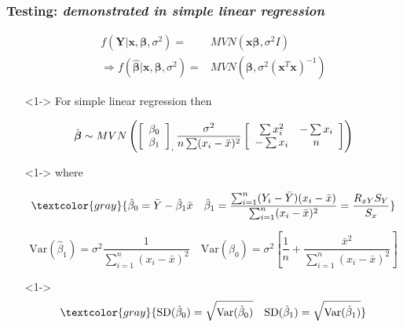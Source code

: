 \documentclass[xcolor={dvipsnames}]{beamer}
\begin{document}
\frame
{
 \frametitle{Testing: \emph{demonstrated in simple linear regression}}
 
 
 \setlength{\leftmargini}{-10pt}
\vspace{-1.5em}
\begin{itemize}
\color{gray}
\item[] 
\begin{align*} 
f(\textbf{Y}|{\textbf{x}, \boldsymbol\beta}, \sigma^2) = {} & MVN(\textbf{x}{\boldsymbol\beta},\sigma^2I) \\
 \Longrightarrow f(\hat {\boldsymbol\beta} | \textbf{x}, {\boldsymbol\beta}, \sigma^2) = {} & MVN\left({\boldsymbol\beta},\sigma^2(\textbf{x}^T\textbf{x})^{-1}\right) 
\end{align*} 

\color{black}

\item[]<1-> For simple linear regression then 

$$\hat {\boldsymbol\beta} \sim MVN\left( \left[\begin{array}{c} \beta_0 \\ \beta_1 \end{array}\right]_{\Large,} 
\frac{\sigma^2}{n \sum (x_i - \bar x)^2} \left[\begin{array}{cc} \sum x_i^2 & - \sum x_i\\ - \sum x_i&  n \end{array} \right] \right) $$

\item[]<1->
where 

$$\textcolor{gray}{\hat \beta_0 = \bar Y -  \hat \beta_1 \bar x \quad
\hat \beta_1 = \frac{\sum_{i=1}^n (Y_i - \bar Y) (x_i - \bar x)}{\sum_{i=1}^n (x_i - \bar x)^2} = \frac{R_{xY}S_Y}{S_x}}$$

$$\text{Var}(\hat \beta_1) = \sigma^2\frac{1}{\sum_{i=1}^n (x_i - \bar x)^2} \quad
\text{Var}(\hat \beta_0) = \sigma^2\left[\frac{1}{n} + \frac{\bar x^2}{\sum_{i=1}^n (x_i - \bar x)^2} \right]$$

\item[]<1-> 
$$\textcolor{gray}{\text{SD}(\hat \beta_0) = \sqrt{\text{Var}(\hat \beta_0)} \quad \text{SD}(\hat \beta_1) = \sqrt{\text{Var}(\hat \beta_1)}}$$
\end{itemize}
}
\end{document}
